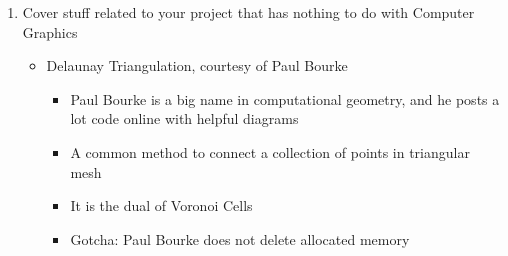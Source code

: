 \documentclass{hw_grad}
\begin{document}
\begin{enumerate}
		\item Cover stuff related to your project that has nothing to do with Computer Graphics
		\begin{itemize}
			\item Delaunay Triangulation, courtesy of Paul Bourke
			\begin{itemize}
				\item Paul Bourke is a big name in computational geometry, and he posts a lot code online with helpful diagrams
				\item A common method to connect a collection of points in triangular mesh
				\item It is the dual of Voronoi Cells
				\item Gotcha: Paul Bourke does not delete allocated memory
			\end{itemize}
			
		\end{itemize}
		

\end{enumerate}
\end{document}
